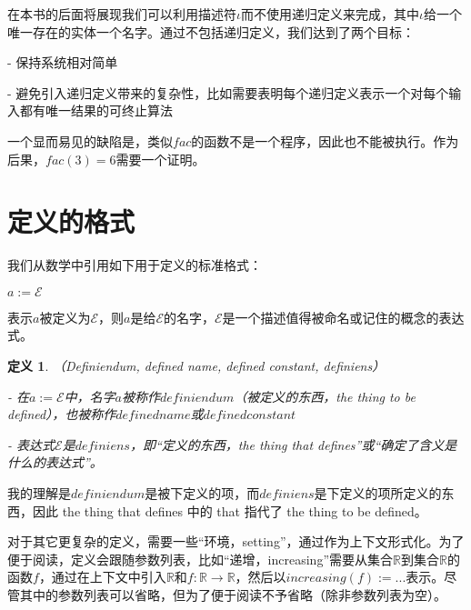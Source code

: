 \documentclass[UTF8]{article}
\newtheorem{thm}{定义}[section]
\begin{document}
		在本书的后面将展现我们可以利用描述符$\iota$而不使用递归定义来完成，其中$\iota$给一个唯一存在的实体一个名字。通过不包括递归定义，我们达到了两个目标：
		
		\noindent
		- 保持系统相对简单
		
		\noindent
		- 避免引入递归定义带来的复杂性，比如需要表明每个递归定义表示一个对每个输入都有唯一结果的可终止算法
		
		一个显而易见的缺陷是，类似$fac$的函数不是一个程序，因此也不能被执行。作为后果，$fac(3)=6$需要一个证明。
		
	\section{定义的格式}
	\noindent
	我们从数学中引用如下用于定义的标准格式：
		
		$a:=\mathcal{E}$
		
		表示$a$被定义为$\mathcal{E}$，则$a$是给$\mathcal{E}$的名字，$\mathcal{E}$是一个描述值得被命名或记住的概念的表达式。
		
		\begin{thm}（Definiendum, defined name, defined constant, definiens）
			
			- 在$a:=\mathcal{E}$中，名字$a$被称作$definiendum$（被定义的东西，the thing to be defined），也被称作$defined name$或$defined constant$
			
			- 表达式$\mathcal{E}$是$definiens$，即“定义的东西，the thing that defines”或“确定了含义是什么的表达式”。
		\end{thm}
	
		我的理解是$definiendum$是被下定义的项，而$definiens$是下定义的项所定义的东西，因此 the thing that defines 中的 that 指代了 the thing to be defined。
		
		对于其它更复杂的定义，需要一些“环境，setting”，通过作为上下文形式化。为了便于阅读，定义会跟随参数列表，比如“递增，increasing”需要从集合$\mathbb{R}$到集合$\mathbb{R}$的函数$f$，通过在上下文中引入$\mathbb{R}$和$f:\mathbb{R}\rightarrow\mathbb{R}$，然后以$increasing(f) := ...$表示。尽管其中的参数列表可以省略，但为了便于阅读不予省略（除非参数列表为空）。
\end{document}
